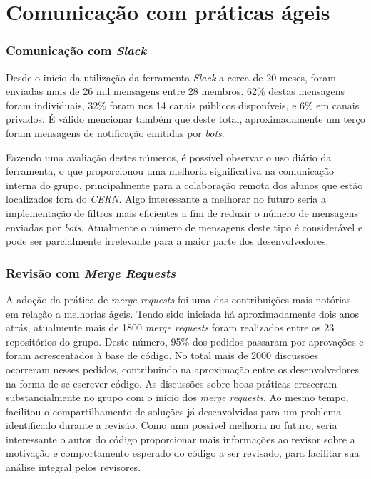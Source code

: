 \hypertarget{praticas-ageis}{%
\section{Comunicação com práticas ágeis}\label{praticas-ageis}}

\hypertarget{comunicacao-com-slack}{%
\subsubsection{\texorpdfstring{Comunicação com \emph{Slack}}{Comunicação com Slack}}\label{comunicacao-com-slack}}

Desde o início da utilização da ferramenta \emph{Slack} a cerca de 20 meses, foram enviadas mais de 26 mil mensagens entre 28 membros. 62\% destas mensagens foram individuais, 32\% foram nos 14 canais públicos disponíveis, e 6\% em canais privados. É válido mencionar também que deste total, aproximadamente um terço foram mensagens de notificação emitidas por \emph{bots}.

Fazendo uma avaliação destes números, é possível observar o uso diário da ferramenta, o que proporcionou uma melhoria significativa na comunicação interna do grupo, principalmente para a colaboração remota dos alunos que estão localizados fora do \emph{CERN}. Algo interessante a melhorar no futuro seria a implementação de filtros mais eficientes a fim de reduzir o número de mensagens enviadas por \emph{bots}. Atualmente o número de mensagens deste tipo é considerável e pode ser parcialmente irrelevante para a maior parte dos desenvolvedores.

\hypertarget{revisao-com-merge-requests}{%
\subsubsection{\texorpdfstring{Revisão com \emph{Merge Requests}}{Revisão com Merge Requests}}\label{revisao-com-merge-requests}}

A adoção da prática de \emph{merge requests} foi uma das contribuições mais notórias em relação a melhorias ágeis. Tendo sido iniciada há aproximadamente dois anos atrás, atualmente mais de 1800 \emph{merge requests} foram realizados entre os 23 repositórios do grupo. Deste número, 95\% dos pedidos passaram por aprovações e foram acrescentados à base de código. No total mais de 2000 discussões ocorreram nesses pedidos, contribuindo na aproximação entre os desenvolvedores na forma de se escrever código. As discussões sobre boas práticas cresceram substancialmente no grupo com o início dos \emph{merge requests}. Ao mesmo tempo, facilitou o compartilhamento de soluções já desenvolvidas para um problema identificado durante a revisão. Como uma possível melhoria no futuro, seria interessante o autor do código proporcionar mais informações ao revisor sobre a motivação e comportamento esperado do código a ser revisado, para facilitar sua análise integral pelos revisores.

